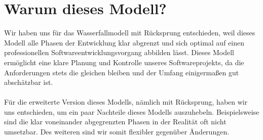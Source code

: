 \section{Warum dieses Modell?}
Wir haben uns für das Wasserfallmodell mit Rücksprung entschieden, weil dieses Modell alle Phasen der 
Entwicklung klar abgrenzt und sich optimal auf einen professionellen Softwareentwicklungsvorgang
abbilden lässt. Dieses Modell ermöglicht eine klare Planung und Kontrolle unseres Softwareprojekts,
da die Anforderungen stets die gleichen bleiben und der Umfang einigermaßen gut abschätzbar ist.\ \\ \\
Für die erweiterte Version dieses Modells, nämlich mit Rücksprung, haben wir uns entschieden, um ein 
paar Nachteile dieses Modells auszuhebeln. Beispielsweise sind die klar voneinander abgegrenzten Phasen
in der Realität oft nicht umsetzbar. Des weiteren sind wir somit flexibler gegenüber Änderungen.
